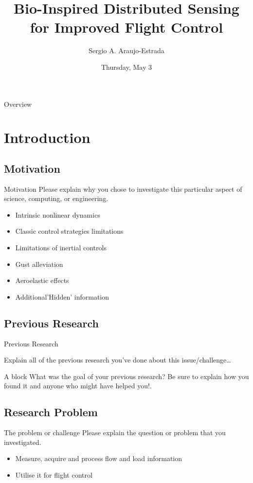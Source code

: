 \documentclass[aspectratio=169]{beamer}            %
\title[Bio-Inspired Distributed Sensing]{Bio-Inspired Distributed Sensing for
	Improved Flight Control}
\author{Sergio A. Araujo-Estrada}
\institute{Research Associate \\
	Aerospace Engineering Department \\
	\href{mailto:s.araujoestrada@bristol.ac.uk}{s.araujoestrada@bristol.ac.uk}}
\date{Thursday, May 3}
\begin{document}
\titlepage

\begin{frame}{Overview}
	\tableofcontents
\end{frame}

\section{Introduction}
\subsection{Motivation}
\begin{frame}{Motivation}
  Please explain why you chose to investigate this particular aspect of science, computing, or engineering.
	\begin{itemize}
		\item{Intrinsic nonlinear dynamics}
		\item{Classic control strategies limitations}
		\item{Limitations of inertial controls}
		\item{Gust alleviation}
		\item{Aeroelastic effects}
		\item{Additional\/'Hidden' information}
	\end{itemize}
\end{frame}

\subsection{Previous Research}
\begin{frame}{Previous Research}

	Explain all of the previous research you’ve done about this issue/challenge\ldots

  \begin{block}{A block}
    What was the goal of your previous research? Be sure to explain how you found it and anyone who might have helped you!.
  \end{block}

\end{frame}

\subsection{Research Problem}
\begin{frame}{The problem or challenge}
  Please explain the question or problem that you investigated.
	\begin{itemize}
		\item Measure, acquire and process flow and load information
		\item Utilise it for flight control
	\end{itemize}
\end{frame}
\end{document}

